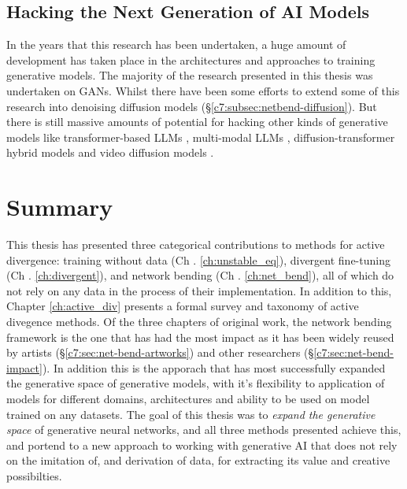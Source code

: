 \subsection{Hacking the Next Generation of AI Models}

In the years that this research has been undertaken, a huge amount of development has taken place in the architectures and approaches to training generative models.
The majority of the research presented in this thesis was undertaken on GANs.
Whilst there have been some efforts to extend some of this research into denoising diffusion models \citep{dzwonczyk2024network} (\S \ref{c7:subsec:netbend-diffusion}). 
But there is still massive amounts of potential for hacking other kinds of generative models like transformer-based LLMs \citep{vaswani2017attention}, multi-modal LLMs \citep{zhang2024mm}, diffusion-transformer hybrid models \citep{peebles2023scalable} and video diffusion models \citep{ho2022video}.

\section{Summary}

This thesis has presented three categorical contributions to methods for active divergence: training without data (Ch . \ref{ch:unstable_eq}), divergent fine-tuning  (Ch . \ref{ch:divergent}), and network bending  (Ch . \ref{ch:net_bend}), all of which do not rely on any data in the process of their implementation. 
In addition to this, Chapter \ref{ch:active_div} presents a formal survey and taxonomy of active divegence methods.
Of the three chapters of original work, the network bending framework is the one that has had the most impact as it has been widely reused by artists  (\S \ref{c7:sec:net-bend-artworks}) and other researchers  (\S \ref{c7:sec:net-bend-impact}). 
In addition this is the apporach that has most successfully expanded the generative space of generative models, with it's flexibility to application of models for different domains, architectures and ability to be used on model trained on any datasets.
The goal of this thesis was to \textit{expand the generative space} of generative neural networks, and all three methods presented achieve this, and portend to a new approach to working with generative AI that does not rely on the imitation of, and derivation of data, for extracting its value and creative possibilties.